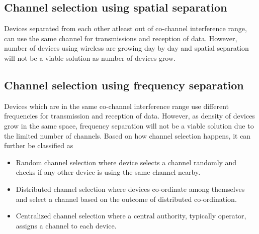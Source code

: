 \documentclass[a4paper]{article}
\begin{document}
\subsection{Channel selection using spatial separation}
Devices separated from each other atleast out of co-channel interference range, can use the same channel for transmissions and reception of data. However, number of devices using wireless are growing day by day and spatial separation will not be a viable solution as number of devices grow.
\subsection{Channel selection using frequency separation}
Devices which are in the same co-channel interference range use different frequencies for transmission and reception of data. However, as density of devices grow in the same space, frequency separation will not be a viable solution due to the limited number of channels. Based on how channel selection happens, it can further be classified as
\begin{itemize}
\item Random channel selection where device selects a channel randomly and checks if any other device is using the same channel nearby.
\item Distributed channel selection where devices co-ordinate among themselves and select a channel based on the outcome of distributed co-ordination.
\item Centralized channel selection where a central authority, typically operator, assigns a channel to each device.
\end{itemize}
\end{document}
